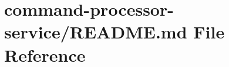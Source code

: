 \hypertarget{command-processor-service_2_r_e_a_d_m_e_8md}{}\section{command-\/processor-\/service/\+R\+E\+A\+D\+ME.md File Reference}
\label{command-processor-service_2_r_e_a_d_m_e_8md}
